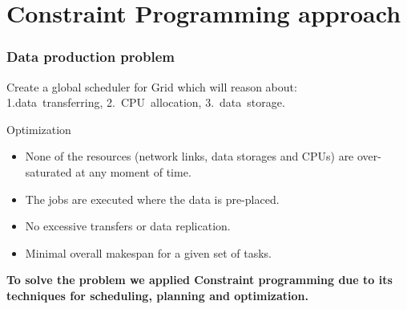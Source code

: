 \documentclass{beamer}
\begin{document}

\section{Constraint Programming approach}
\begin{frame}\frametitle{Data production problem}
 		\begin{block}{}
Create a global scheduler for Grid which will reason about:\\
\hspace{1cm} 1.data~transferring, \hspace{1cm} 2.~CPU~allocation,\hspace{1cm} 3.~data~storage.  
\end{block}
\begin{block}{Optimization}  
		\begin{itemize}
			\item None of the resources (network links, data storages and CPUs) are over-saturated at any moment of time.
			\item The jobs are executed  where the data is pre-placed.
			\item No excessive transfers or data replication.
			\item Minimal overall makespan for a given set of tasks.
		\end{itemize}
 	\end{block}
\begin{block}{}
\textbf{To solve the problem we applied Constraint programming due to its techniques for scheduling, planning and optimization.}
 	\end{block} 	
\end{frame}
\end{document}
